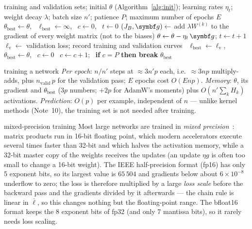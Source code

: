 \documentclass[11pt]{article}
\newcommand{\gvec}{\vect{g}}
\begin{document}
\begin{algorithm}[H]
\caption{Training a network with mini-batch SGD, weight decay and early stopping}\label{alg:train}
\begin{algorithmic}[1]
\Require training and validation sets; initial $\theta$ (Algorithm~\ref{alg:init}); learning rates $\eta_t$; weight
  decay $\lambda$; batch size $n'$; patience $P$; maximum number of epochs $E$
  \State $\theta_{\text{best}} \gets \theta$, \ $\ell_{\text{best}} \gets \infty$, \ $c \gets 0$, \ $t \gets 0$
      \State $(J_B, \gvec) \gets$  
      \State add $\lambda W^{(k)}$ to the gradient of every weight matrix (not to the biases) 
      \State $\theta \gets \theta - \eta_t\,\gvec$; \quad $t \gets t + 1$ 
    \EndFor
    \State $\ell_{\mathrm{v}} \gets$ validation loss; record training and validation curves 
     \ $\ell_{\text{best}} \gets \ell_{\mathrm{v}}$, \ $\theta_{\text{best}} \gets \theta$, \ $c \gets 0$
    \Else \ $c \gets c + 1$; \ \textbf{if} $c = P$ \textbf{then break}
    \EndIf
  \EndFor
  \State \Return $\theta_{\text{best}}$
\EndFunction
\end{algorithmic}
\end{algorithm}

\begin{runtime}{training a network}
\emph{Per epoch}: $n/n'$ steps at $\approx 3n'p$ each, i.e.\ $\approx 3np$ multiply-adds, plus $n_{\mathrm{valid}}\,p$ for the
validation pass; $E$ epochs cost $O(Enp)$. \emph{Memory}: $\theta$, its gradient and $\theta_{\text{best}}$ ($3p$ numbers;
$+2p$ for AdamW's moments) plus $O(n'\sum_k H_k)$ activations. \emph{Prediction}: $O(p)$ per example, independent of $n$ ---
unlike kernel methods (Note~10), the training set is not needed after training.
\end{runtime}

\begin{modern}{mixed-precision training}
Most large networks are trained in \emph{mixed precision}~\cite{micikevicius2018}: matrix products run in 16-bit floating
point, which modern accelerators execute several times faster than 32-bit and which halves the activation memory,
while a 32-bit master copy of the weights receives the updates (an update $\eta g$ is often too small to change a
16-bit weight). The IEEE half-precision format (fp16) has only 5 exponent bits, so its largest value is $65\,504$ and
gradients below about $6 \times 10^{-8}$ underflow to zero; the loss is therefore multiplied by a large \emph{loss scale}
before the backward pass and the gradients divided by it afterwards --- the chain rule is linear in $\bar{\ell}$, so this
changes nothing but the floating-point range. The bfloat16 format keeps the 8 exponent bits of fp32 (and only 7 mantissa
bits), so it rarely needs loss scaling.
\end{modern}
\end{document}
